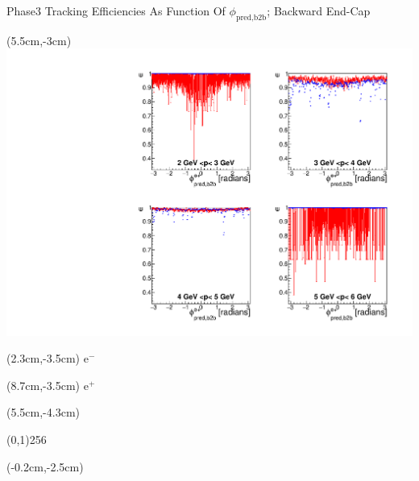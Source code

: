 \documentclass[8pt]{beamer}
\begin{document}
\begin{frame}{Phase3 Tracking Efficiencies As Function Of $\phi_{\textrm{pred,b2b}}$; Backward End-Cap}
	
	
	\begin{textblock*}{6.5cm}(5.5cm,-3cm)
		\includegraphics[width=\textwidth]{VPlots/P3/xPMPhiepECP3}
	\end{textblock*}
	
	\begin{textblock*}{2cm}(2.3cm,-3.5cm)
		$\textrm{e}^-$
	\end{textblock*}
	
	\begin{textblock*}{2cm}(8.7cm,-3.5cm)
		$\textrm{e}^+$
	\end{textblock*}
	
	
	\begin{textblock*}{11cm}(5.5cm,-4.3cm)
		
		\begin{center}
			\line(0,1){256}
		\end{center}
		
	\end{textblock*}
	
	
	\begin{textblock*}{6.5cm}(-0.2cm,-2.5cm)
		
		\setlength{\unitlength}{5cm}
	\end{textblock*}
	
	
	

\end{frame}
\end{document}
